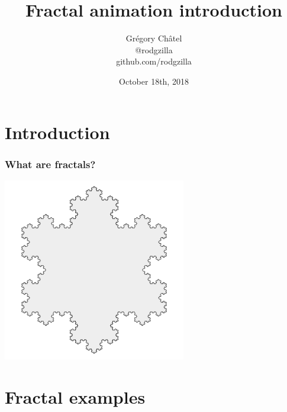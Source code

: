 \documentclass[9pt]{beamer}
\title{Fractal animation introduction}
\author[G. Châtel]{Grégory Châtel\\\vspace{0.3cm}@rodgzilla\\github.com/rodgzilla}
\date{October 18th, 2018}
\begin{document}
\begin{frame}

  \maketitle

\end{frame}

\section{Introduction}

\begin{frame}

  \frametitle{What are fractals?}

  \begin{center}
    \includegraphics[width = 8cm]{images/koch_snowflake.png}
  \end{center}

\end{frame}

\section{Fractal examples}
\end{document}

